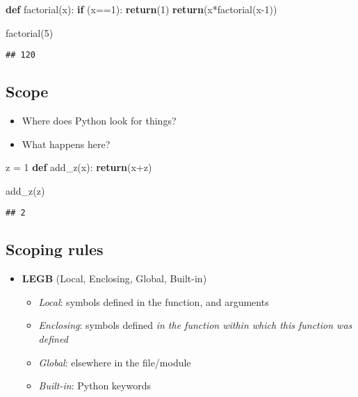 \documentclass[]{tufte-handout}
\newenvironment{Shaded}{}{}
\newcommand{\KeywordTok}[1]{\textcolor[rgb]{0.00,0.44,0.13}{\textbf{{#1}}}}
\newcommand{\DecValTok}[1]{\textcolor[rgb]{0.25,0.63,0.44}{{#1}}}
\newcommand{\ControlFlowTok}[1]{\textcolor[rgb]{0.00,0.44,0.13}{\textbf{{#1}}}}
\newcommand{\OperatorTok}[1]{\textcolor[rgb]{0.40,0.40,0.40}{{#1}}}
\newcommand{\NormalTok}[1]{{#1}}
\providecommand{\tightlist}{%
  \setlength{\itemsep}{0pt}\setlength{\parskip}{0pt}}
\begin{document}
\begin{Shaded}
\begin{Highlighting}[]
\KeywordTok{def} \NormalTok{factorial(x):}
    \ControlFlowTok{if} \NormalTok{(x}\OperatorTok{==}\DecValTok{1}\NormalTok{):}
        \ControlFlowTok{return}\NormalTok{(}\DecValTok{1}\NormalTok{)}
    \ControlFlowTok{return}\NormalTok{(x}\OperatorTok{*}\NormalTok{factorial(x}\DecValTok{-1}\NormalTok{))}

\NormalTok{factorial(}\DecValTok{5}\NormalTok{)}
\end{Highlighting}
\end{Shaded}

\begin{verbatim}
## 120
\end{verbatim}

\subsection{Scope}\label{scope}

\begin{itemize}
\tightlist
\item
  Where does Python look for things?
\item
  What happens here?
\end{itemize}

\begin{Shaded}
\begin{Highlighting}[]
\NormalTok{z }\OperatorTok{=} \DecValTok{1}
\KeywordTok{def} \NormalTok{add_z(x):}
    \ControlFlowTok{return}\NormalTok{(x}\OperatorTok{+}\NormalTok{z)}

\NormalTok{add_z(z)}
\end{Highlighting}
\end{Shaded}

\begin{verbatim}
## 2
\end{verbatim}

\subsection{Scoping rules}\label{scoping-rules}

\begin{itemize}
\tightlist
\item
  \textbf{LEGB} (Local, Enclosing, Global, Built-in)

  \begin{itemize}
  \tightlist
  \item
    \emph{Local}: symbols defined in the function, and arguments
  \item
    \emph{Enclosing}: symbols defined \emph{in the function within which
    this function was defined}
  \item
    \emph{Global}: elsewhere in the file/module
  \item
    \emph{Built-in}: Python keywords
  \end{itemize}
\end{itemize}
\end{document}

